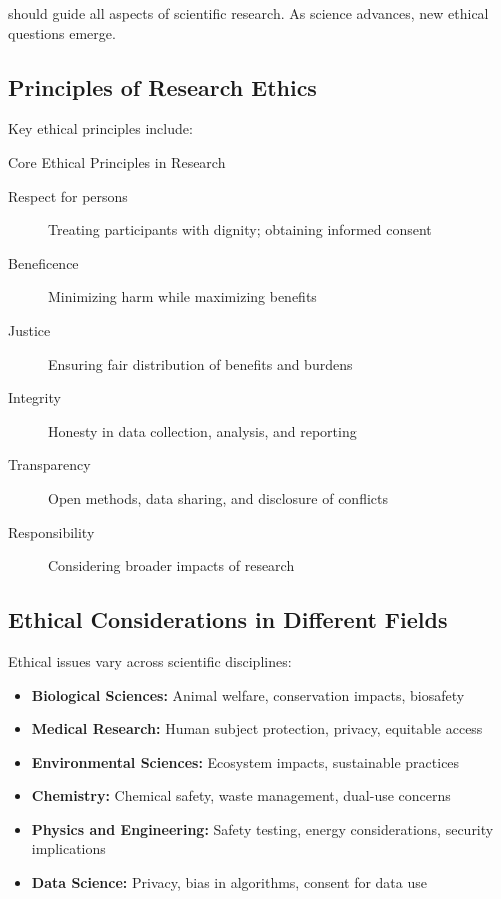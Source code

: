  should guide all aspects of scientific research. As science advances, new ethical questions emerge.

\subsection{Principles of Research Ethics}

Key ethical principles include:

\begin{keyconcept}{Core Ethical Principles in Research}
\begin{description}
    \item[Respect for persons] Treating participants with dignity; obtaining informed consent
    \item[Beneficence] Minimizing harm while maximizing benefits
    \item[Justice] Ensuring fair distribution of benefits and burdens
    \item[Integrity] Honesty in data collection, analysis, and reporting
    \item[Transparency] Open methods, data sharing, and disclosure of conflicts
    \item[Responsibility] Considering broader impacts of research
\end{description}
\end{keyconcept}

\subsection{Ethical Considerations in Different Fields}

Ethical issues vary across scientific disciplines:

\begin{itemize}
    \item \textbf{Biological Sciences:} Animal welfare, conservation impacts, biosafety
    \item \textbf{Medical Research:} Human subject protection, privacy, equitable access
    \item \textbf{Environmental Sciences:} Ecosystem impacts, sustainable practices
    \item \textbf{Chemistry:} Chemical safety, waste management, dual-use concerns
    \item \textbf{Physics and Engineering:} Safety testing, energy considerations, security implications
    \item \textbf{Data Science:} Privacy, bias in algorithms, consent for data use
\end{itemize}

